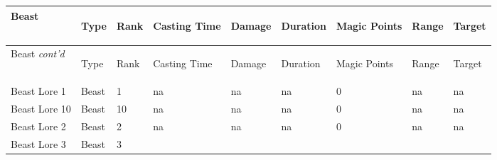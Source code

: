 \documentclass[twoside]{book}
\begin{document}
\begin{longtable}{p{1.25in}lp{2em}p{1.5em}lllll} 
  Beast& \begin{turn}{70}{Type}\end{turn}
          & \begin{turn}{70}{Rank}\end{turn}
          & \begin{turn}{70}{Casting Time}\end{turn}
          & \begin{turn}{70}{Damage}\end{turn}
          & \begin{turn}{70}{Duration}\end{turn}
          & \begin{turn}{70}{Magic Points}\end{turn}
          & \begin{turn}{70}{Range}\end{turn}
          & \begin{turn}{70}{Target}\end{turn}
          \\
  \hline
  \hline
  \endfirsthead
  Beast \textit{cont'd}
        & \begin{turn}{70}{Type}\end{turn}
          & \begin{turn}{70}{Rank}\end{turn}
          & \begin{turn}{70}{Casting Time}\end{turn}
          & \begin{turn}{70}{Damage}\end{turn}
          & \begin{turn}{70}{Duration}\end{turn}
          & \begin{turn}{70}{Magic Points}\end{turn}
          & \begin{turn}{70}{Range}\end{turn}
          & \begin{turn}{70}{Target}\end{turn}
           \\
  \hline
  \endhead
\raggedright  Beast Lore 1& Beast& 1&
           na& na& na& 0& na& na\tabularnewline
      \raggedright  Beast Lore 10& Beast& 10&
           na& na& na& 0& na& na\tabularnewline
      \raggedright  Beast Lore 2& Beast& 2&
           na& na& na& 0& na& na\tabularnewline
      \raggedright  Beast Lore 3& Beast& 3&

\end{longtable}
\end{document}

